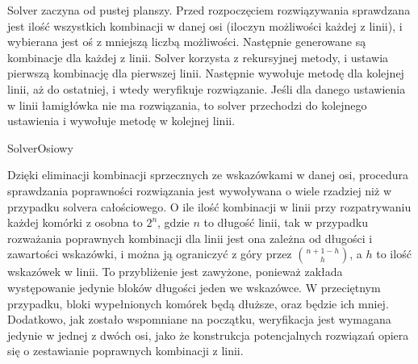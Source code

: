     Solver zaczyna od pustej planszy. Przed rozpoczęciem rozwiązywania sprawdzana jest ilość wszystkich
kombinacji w danej osi (iloczyn możliwości każdej z linii), i wybierana jest oś z mniejszą liczbą
możliwości. Następnie generowane są kombinacje dla każdej z linii. Solver korzysta z rekursyjnej
metody, i ustawia pierwszą kombinację dla pierwszej linii. Następnie wywołuje metodę dla kolejnej linii,
aż do ostatniej, i wtedy weryfikuje rozwiązanie. Jeśli dla danego ustawienia w linii łamigłówka
nie ma rozwiązania, to solver przechodzi do kolejnego ustawienia i wywołuje metodę w kolejnej linii.

\begin{pseudokod}[H]
    \caption{SolverOsiowy}\label{alg:axisSolver}
\end{pseudokod}

    Dzięki eliminacji kombinacji sprzecznych ze wskazówkami w danej osi, procedura sprawdzania
poprawności rozwiązania jest wywoływana o wiele rzadziej niż w przypadku solvera całościowego.
O ile ilość kombinacji w linii przy rozpatrywaniu każdej komórki z osobna to $2^n$, gdzie $n$ to
długość linii, tak w przypadku rozważania poprawnych kombinacji dla linii jest ona zależna od
długości i zawartości wskazówki, i można ją ograniczyć z góry przez
${n + 1 - h} \choose h$, a $h$ to ilość wskazówek w linii. To przybliżenie jest zawyżone, ponieważ
zakłada występowanie jedynie bloków długości jeden we wskazówce. W przeciętnym przypadku, bloki
wypełnionych komórek będą dłuższe, oraz będzie ich mniej. Dodatkowo, jak zostało wspomniane na początku,
weryfikacja jest wymagana jedynie w jednej z dwóch osi, jako że konstrukcja potencjalnych rozwiązań
opiera się o zestawianie poprawnych kombinacji z linii.


